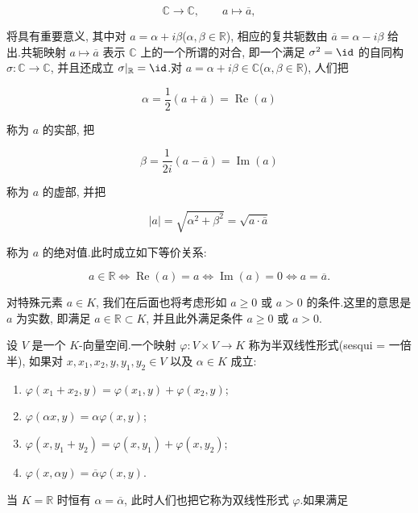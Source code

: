 \[
\mathbb{C} \longrightarrow \mathbb{C}, \qquad a \longmapsto \overline{a},
\]

将具有重要意义, 其中对 $a = \alpha + i \beta$($\alpha, \beta \in \mathbb{R}$), 相应的复共轭数由 $\overline{a} = \alpha - i \beta$ 给出.共轭映射 $a \longmapsto \overline{a}$ 表示 $\mathbb{C}$ 上的一个所谓的对合, 即一个满足 $\sigma^2 = \id$ 的自同构 $\sigma \colon \mathbb{C} \longrightarrow \mathbb{C}$, 并且还成立 $\sigma|_{\mathbb{R}} = \id$.对 $a = \alpha + i \beta \in \mathbb{C}$($\alpha, \beta \in \mathbb{R}$), 人们把

\[
\alpha = \frac{1}{2}(a + \overline{a}) = \operatorname{Re}(a)
\]

称为 $a$ 的实部, 把

\[
\beta = \frac{1}{2i}(a - \overline{a}) = \operatorname{Im}(a)
\]

称为 $a$ 的虚部, 并把

\[
|a| = \sqrt{\alpha^2 + \beta^2} = \sqrt{a \cdot \overline{a}}
\]

称为 $a$ 的绝对值.此时成立如下等价关系:

\[
a \in \mathbb{R} \Longleftrightarrow \operatorname{Re}(a) = a \Longleftrightarrow \operatorname{Im}(a) = 0 \Longleftrightarrow a = \overline{a}\text{.}
\]

对特殊元素 $a \in K$, 我们在后面也将考虑形如 $a \geq 0$ 或 $a > 0$ 的条件.这里的意思是 $a$ 为实数, 即满足 $a \in \mathbb{R} \subset K$, 并且此外满足条件 $a \geq 0$ 或 $a > 0$.

\begin{definition}\label{def:7.1.1}
设 $V$ 是一个 $K$-向量空间.一个映射 $\varphi \colon V \times V \longrightarrow K$ 称为半双线性形式(sesqui = 一倍半), 如果对 $x, x_1, x_2, y, y_1, y_2 \in V$ 以及 $\alpha \in K$ 成立:
\begin{enumerate}
\item[(i)] $\varphi(x_1 + x_2, y) = \varphi(x_1, y) + \varphi(x_2, y)$;
\item[(ii)] $\varphi(\alpha x, y) = \alpha \varphi(x, y)$;
\item[(iii)] $\varphi(x, y_1 + y_2) = \varphi(x, y_1) + \varphi(x, y_2)$;
\item[(iv)] $\varphi(x, \alpha y) = \overline{\alpha} \varphi(x, y)$.
\end{enumerate}
\end{definition}

当 $K = \mathbb{R}$ 时恒有 $\alpha = \overline{\alpha}$, 此时人们也把它称为双线性形式 $\varphi$.如果满足

